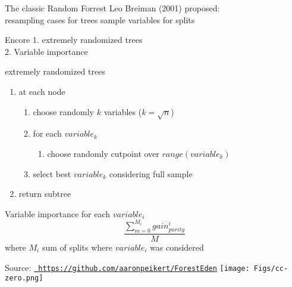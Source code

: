 \documentclass[12pt,t]{beamer}
\begin{document}
{\begin{frame}[c]{The classic Random Forrest}
    Leo Breiman (2001) proposed:\\
    resampling cases for trees \newline
    sample variables for splits
\end{frame}

\begin{frame}[c]{Encore}
  \Large
  1. extremely randomized trees\\
  2. Variable importance\\
\end{frame}

\begin{frame}[c]{extremely randomized trees}
  \begin{enumerate}
    \item at each node
    \begin{enumerate}
       \item choose \textcolor<2>{hilit}{randomly} $k$ variables ($k = \sqrt{n}$)
       \item for each $variable_k$
       \begin{enumerate}
          \item choose \textcolor<2>{hilit}{randomly} cutpoint over $range(variable_k)$
        \end{enumerate}
        \item select best $variable_k$ \textcolor<3>{vhilit}{considering full sample}
    \end{enumerate}
    \item return subtree
 \end{enumerate}
\end{frame}

\begin{frame}[c]{Variable importance}
  for each $variable_i$
  $$\frac{\sum_{m=0}^{M_i} gain_{purity}^i}{M}$$
  where $M_i$ sum of splits where $variable_i$ was considered
\end{frame}

\begin{frame}

\Large

\vspace{10mm}

\scriptsize {\lolit Source:} \href{https://github.com/aaronpeikert/ForestEden}{\tt \scriptsize
  \color{foreground} https://github.com/aaronpeikert/ForestEden} \quad
\texttt{[image: Figs/cc-zero.png]}


\end{frame}}
\end{document}
